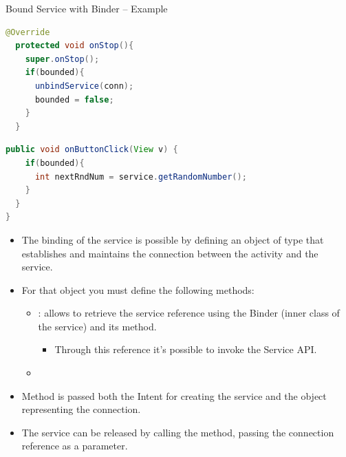 \documentclass{beamer}
\begin{document}
\begin{frame}{Bound Service with Binder -- Example}
\begin{exampleblock}{\vspace{-10pt}}
\begin{lstlisting}[language=Java]
  @Override
  protected void onStop(){
    super.onStop();
    if(bounded){
      unbindService(conn);
      bounded = false;
    }
  }
      \end{lstlisting}
    \end{exampleblock}  
    \begin{exampleblock}{\vspace{-10pt}}
      \begin{lstlisting}[language=Java]
  public void onButtonClick(View v) {
    if(bounded){
      int nextRndNum = service.getRandomNumber();
    }
  }
}
      \end{lstlisting}
    \end{exampleblock}
      \begin{itemize}
        \item The binding of the service is possible by defining an object of type
         that establishes and maintains
        the connection between the activity and the service.
        \item For that object you must define the following methods:
        \begin{itemize}
          \item {}: allows to retrieve the service
          reference using the Binder (inner class of the service) and its
           method. 
          \begin{itemize}
            \item Through this reference it's possible to invoke the Service API.
          \end{itemize}
          \item {}  
        \end{itemize}
        \item Method  is passed both the Intent for creating the service and
        the object representing the connection.
        \item The service can be released by calling the 
        method, passing the connection reference as a parameter.
      \end{itemize}
    \end{frame}
\end{document}
